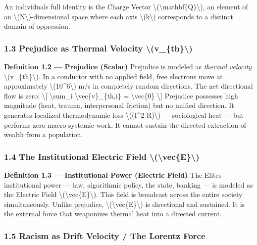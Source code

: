 An individual\textquotesingle s full identity is the Charge Vector
\textbackslash(\textbackslash mathbf\{Q\}\textbackslash), an element of
an \textbackslash(N\textbackslash)-dimensional space where each axis
\textbackslash(k\textbackslash) corresponds to a distinct domain of
oppression.

\subsubsection{1.3 Prejudice as Thermal Velocity
\textbackslash(v\_\{th\}\textbackslash)}\label{prejudice-as-thermal-velocity-v_th}

\textbf{Definition 1.2 --- Prejudice (Scalar)} Prejudice is modeled as
\emph{thermal velocity} \textbackslash(v\_\{th\}\textbackslash). In a
conductor with no applied field, free electrons move at approximately
\textbackslash(10\^{}6\textbackslash) m/s in completely random
directions. The net directional flow is zero: \textbackslash{[}
\textbackslash sum\_i \textbackslash vec\{v\}\_\{th,i\} =
\textbackslash vec\{0\} \textbackslash{]} Prejudice possesses high
magnitude (heat, trauma, interpersonal friction) but no unified
direction. It generates localized thermodynamic loss
\textbackslash((I\^{}2 R)\textbackslash) --- sociological heat --- but
performs zero macro-systemic work. It cannot sustain the directed
extraction of wealth from a population.

\subsubsection{1.4 The Institutional Electric Field
\textbackslash(\textbackslash vec\{E\}\textbackslash)}\label{the-institutional-electric-field-vece}

\textbf{Definition 1.3 --- Institutional Power (Electric Field)} The
Elite\textquotesingle s institutional power --- law, algorithmic policy,
the state, banking --- is modeled as the Electric Field
\textbackslash(\textbackslash vec\{E\}\textbackslash). This field is
broadcast across the entire society simultaneously. Unlike prejudice,
\textbackslash(\textbackslash vec\{E\}\textbackslash) is directional and
sustained. It is the external force that weaponizes thermal heat into a
directed current.

\subsubsection{1.5 Racism as Drift Velocity / The Lorentz
Force}\label{racism-as-drift-velocity-the-lorentz-force}

